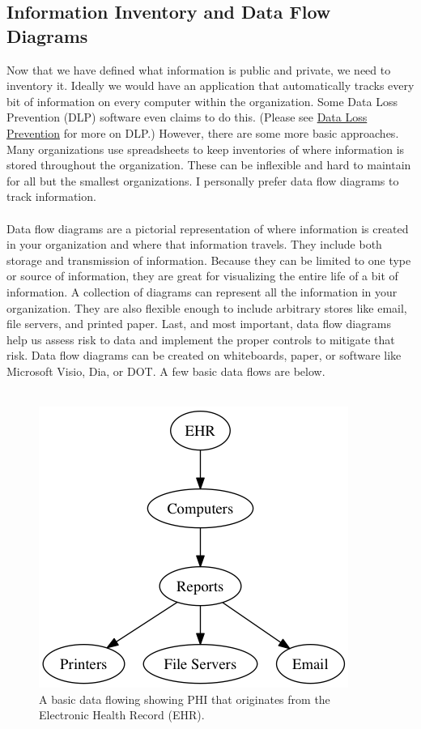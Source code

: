 \subsection{Information Inventory and Data Flow Diagrams}
Now that we have defined what information is public and private, we need to inventory it. Ideally we would have an application that automatically tracks every bit of information on every computer within the organization. Some Data Loss Prevention (DLP) software even claims to do this. (Please see \hyperref[subsubsec:"Data Loss Prevention"]{Data Loss Prevention} for more on DLP.) However, there are some more basic approaches. Many organizations use spreadsheets to keep inventories of where information is stored throughout the organization. These can be inflexible and hard to maintain for all but the smallest organizations. I personally prefer data flow diagrams to track information.\\\\
Data flow diagrams are a pictorial representation of where information is created in your organization and where that information travels. They include both storage and transmission of information. Because they can be limited to one type or source of information, they are great for visualizing the entire life of a bit of information. A collection of diagrams can represent all the information in your organization. They are also flexible enough to include arbitrary stores like email, file servers, and printed paper. Last, and most important, data flow diagrams help us  assess risk to data and implement the proper controls to mitigate that risk. Data flow diagrams can be created on whiteboards, paper, or software like Microsoft Visio, Dia, or DOT. A few basic data flows are below.\\\\
\begin{figure}[h]
\centering\includegraphics[scale=.75]{./img/ehrDataFlow}
\caption{A basic data flowing showing PHI that originates from the Electronic Health Record (EHR).}
\end{figure}
